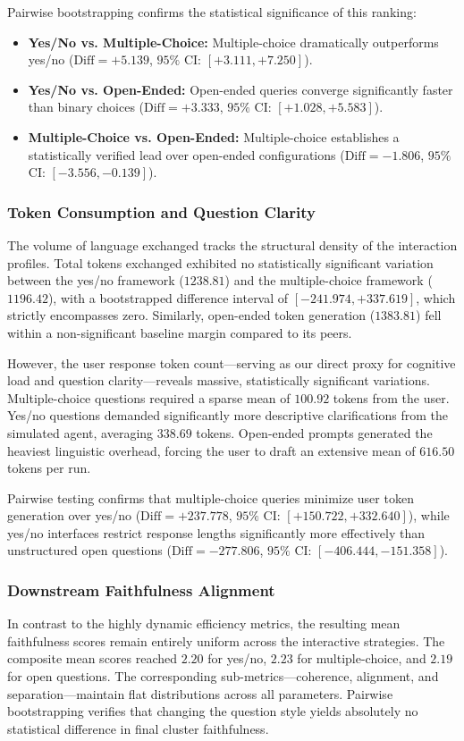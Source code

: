 Pairwise bootstrapping confirms the statistical significance of this ranking:
\begin{itemize}
    \item \textbf{Yes/No vs. Multiple-Choice:} 
    Multiple-choice dramatically outperforms yes/no ($\text{Diff} = +5.139$, $95\%$ CI: $[+3.111, +7.250]$). 
    \item \textbf{Yes/No vs. Open-Ended:} 
    Open-ended queries converge significantly faster than binary choices ($\text{Diff} = +3.333$, $95\%$ CI: $[+1.028, +5.583]$).
    \item \textbf{Multiple-Choice vs. Open-Ended:} 
    Multiple-choice establishes a statistically verified lead over open-ended configurations ($\text{Diff} = -1.806$, $95\%$ CI: $[-3.556, -0.139]$).
\end{itemize}

\subsubsection{Token Consumption and Question Clarity}
The volume of language exchanged tracks the structural density of the interaction profiles. 
Total tokens exchanged exhibited no statistically significant variation between the yes/no framework ($1238.81$) and the multiple-choice framework ($1196.42$), with a bootstrapped difference interval of $[-241.974, +337.619]$, which strictly encompasses zero. 
Similarly, open-ended token generation ($1383.81$) fell within a non-significant baseline margin compared to its peers.

However, the user response token count—serving as our direct proxy for cognitive load and question clarity—reveals massive, statistically significant variations. 
Multiple-choice questions required a sparse mean of $100.92$ tokens from the user.
Yes/no questions demanded significantly more descriptive clarifications from the simulated agent, averaging $338.69$ tokens.
Open-ended prompts generated the heaviest linguistic overhead, forcing the user to draft an extensive mean of $616.50$ tokens per run. 

Pairwise testing confirms that multiple-choice queries minimize user token generation over yes/no ($\text{Diff} = +237.778$, $95\%$ CI: $[+150.722, +332.640]$), while yes/no interfaces restrict response lengths significantly more effectively than unstructured open questions ($\text{Diff} = -277.806$, $95\%$ CI: $[-406.444, -151.358]$).

\subsubsection{Downstream Faithfulness Alignment}
In contrast to the highly dynamic efficiency metrics, the resulting mean faithfulness scores remain entirely uniform across the interactive strategies. 
The composite mean scores reached $2.20$ for yes/no, $2.23$ for multiple-choice, and $2.19$ for open questions.
The corresponding sub-metrics—coherence, alignment, and separation—maintain flat distributions across all parameters. 
Pairwise bootstrapping verifies that changing the question style yields absolutely no statistical difference in final cluster faithfulness.

